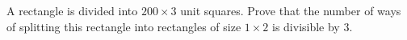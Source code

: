 A rectangle is divided into $200\times 3$ unit squares. Prove that the number of ways of splitting this rectangle into rectangles of size $1\times 2$ is divisible by $3$.